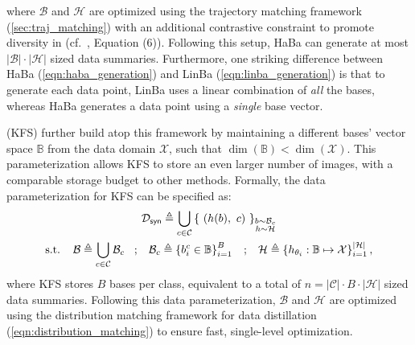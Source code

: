 \documentclass[10pt]{article} %
\begin{document}
where $\mathcal{B}$ and $\mathcal{H}$ are optimized using the trajectory matching framework (\cref{sec:traj_matching}) with an additional contrastive constraint to promote diversity in \distill (cf.~\citet{haba}, Equation (6)). Following this setup, HaBa can generate at most $|\mathcal{B}|\cdot|\mathcal{H}|$ sized data summaries. Furthermore, one striking difference between HaBa (\cref{eqn:haba_generation}) and LinBa (\cref{eqn:linba_generation}) is that to generate each data point, LinBa uses a linear combination of \emph{all} the bases, whereas HaBa generates a data point using a \emph{single} base vector. 

\citet{kfs} (KFS) further build atop this framework by maintaining a different bases' vector space $\mathbb{B}$ from the data domain $\mathcal{X}$, such that $\dim(\mathbb{B}) < \dim(\mathcal{X})$. This parameterization allows KFS to store an even larger number of images, with a comparable storage budget to other methods. Formally, the data parameterization for KFS can be specified as:
\begin{equation} \label{eqn:kfs_generation}
\begin{gathered}
    \distill \triangleq \bigcup_{c \in \mathcal{C}} \left\{ ~ (h(b), ~c) ~ \right\}_{\raisebox{6pt}{$\substack{b \sim \mathcal{B}_c\\h \sim \mathcal{H}}$}} \\
    \text{s.t.} \hspace{0.4cm}
    \mathcal{B} \triangleq \bigcup_{c \in \mathcal{C}} \mathcal{B}_c 
    \hspace{0.3cm} ; \hspace{0.3cm} 
    \mathcal{B}_c \triangleq \left\{ b^c_i \in \mathbb{B} \right\}_{i=1}^{B}
    \hspace{0.3cm} ; \hspace{0.3cm} 
    \mathcal{H} \triangleq \left\{ h_{\theta_i} : \mathbb{B} \mapsto \mathcal{X} \right\}_{i=1}^{|\mathcal{H}|},
\end{gathered}
\end{equation}
where KFS stores $B$ bases per class, equivalent to a total of $n = |\mathcal{C}| \cdot B \cdot |\mathcal{H}|$ sized data summaries. Following this data parameterization, $\mathcal{B}$ and $\mathcal{H}$ are optimized using the distribution matching framework for data distillation (\cref{eqn:distribution_matching}) to ensure fast, single-level optimization.
\end{document}
